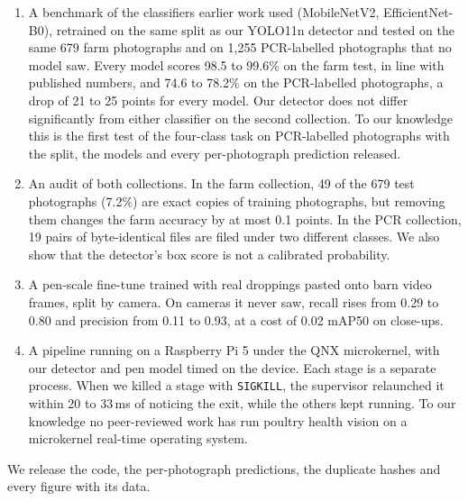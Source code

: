 \begin{enumerate}
\item A benchmark of the classifiers earlier work used (MobileNetV2, EfficientNet-B0), retrained on the same split as
  our YOLO11n detector and tested on the same 679 farm photographs and on 1,255 PCR-labelled photographs that no model
  saw. Every model scores 98.5 to 99.6\% on the farm test, in line with published numbers, and 74.6 to 78.2\% on the
  PCR-labelled photographs, a drop of 21 to 25 points for every model. Our detector does not differ significantly from
  either classifier on the second collection. To our knowledge this is the first test of the four-class task on
  PCR-labelled photographs with the split, the models and every per-photograph prediction released.
\item An audit of both collections. In the farm collection, 49 of the 679 test photographs (7.2\%) are exact copies of
  training photographs, but removing them changes the farm accuracy by at most 0.1 points. In the PCR collection, 19
  pairs of byte-identical files are filed under two different classes. We also show that the detector's box score is
  not a calibrated probability.
\item A pen-scale fine-tune trained with real droppings pasted onto barn video frames, split by camera. On cameras it
  never saw, recall rises from 0.29 to 0.80 and precision from 0.11 to 0.93, at a cost of 0.02 mAP50 on close-ups.
\item A pipeline running on a Raspberry Pi 5 under the QNX microkernel, with our detector and pen model timed on the
  device. Each stage is a separate process. When we killed a stage with \texttt{SIGKILL}, the supervisor relaunched it within 20 to 33\,ms of noticing the exit, while the others kept running. To our knowledge no peer-reviewed work has run poultry health vision on a
  microkernel real-time operating system.
\end{enumerate}

We release the code, the per-photograph predictions, the duplicate hashes and every figure with its data.
